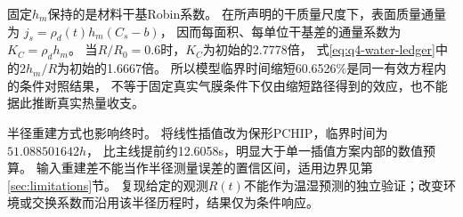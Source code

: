 固定$h_m$保持的是材料干基Robin系数。
在所声明的干质量尺度下，表面质量通量为
$j_s=\rho_d(t)h_m(C_s-b)$，
因而每面积、每单位干基差的通量系数为$K_C=\rho_d h_m$。
当$R/R_0=0.6$时，$K_C$为初始的2.7778倍，
式\eqref{eq:q4-water-ledger}中的$2h_m/R$为初始的1.6667倍。
所以模型临界时间缩短60.6526\%是同一有效方程内的条件对照结果，
不等于固定真实气膜条件下仅由缩短路径得到的效应，也不能据此推断真实热量收支。

半径重建方式也影响终时。
将线性插值改为保形PCHIP，临界时间为$51.088501642\unit{h}$，
比主线提前约12.6058\unit{s}，明显大于单一插值方案内部的数值预算。
输入重建差不能当作半径测量误差的置信区间，适用边界见第\ref{sec:limitations}节。
复现给定的观测$R(t)$不能作为温湿预测的独立验证；改变环境或交换系数而沿用该半径历程时，结果仅为条件响应。

\endgroup
